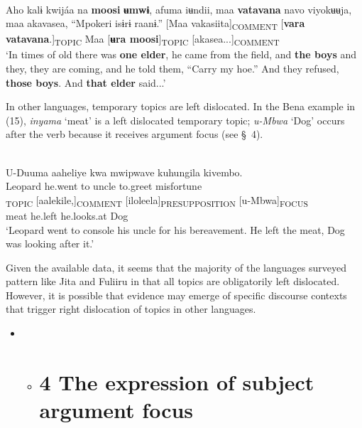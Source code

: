 \documentclass[output=paper]{langsci/langscibook}
\begin{document}
\ea\label{ex:}
\\
Aho kalɨ kwijáa na \textbf{moosi }\textbf{ʉ}\textbf{mw}\textbf{ɨ}, afuma iʉndii, maa \textbf{vatavana} navo viyokʉʉja, maa akavasea, “Mpokeri isɨrɨ raanɨ.” [Maa vakasiita]\textsubscript{COMME}\textsubscript{NT} [\textbf{vara vatavana}.]\textsubscript{TOPIC} Maa [\textbf{ʉ}\textbf{ra moosi}]\textsubscript{TOPIC} [akasea...]\textsubscript{COMMENT}\\
\glt \textup{‘}\textup{In times of old there was }\textbf{\textup{one elder}}\textup{, he came from the field, and }\textbf{\textup{the boys}}\textup{ and they, they are coming, and he told them, “Carry my hoe.” And }\textup{they refused, }\textbf{\textup{those boys}}\textup{. And }\textbf{\textup{that elder}}\textup{ said...’}
\z

In other languages, temporary topics are left dislocated. In the Bena example in (15), \emph{inyama} ‘meat’ is a left dislocated temporary topic; \textit{u}\textit{\nobreakdash-Mbwa} ‘Dog’ occurs after the verb because it receives argument focus (see §~4).

\ea\label{ex:}
\\
\gll U-Duuma aaheliye kwa mwipwave kuhungila kivembo.\\
Leopard he.went to uncle to.greet misfortune\\


\gll [Inyama]\textsubscript{TOPIC} [aalekile,]\textsubscript{COMMENT} [iloleela]\textsubscript{PRESUPPOSITION} [u-Mbwa]\textsubscript{FOCUS}\\
meat he.left he.looks.at Dog\\


\glt \textup{‘Leopard went to console his uncle for his bereavement. He left}\textup{ the meat, Dog was looking after it}\textup{.’}
\z

Given the available data, it seems that the majority of the languages surveyed pattern like Jita and Fuliiru in that all topics are obligatorily left dislocated. However, it is possible that evidence may emerge of specific discourse contexts that trigger right dislocation of topics in other languages.

\begin{itemize}
\item \begin{itemize}
\item \section{4  The expression of subject argument focus}\end{itemize}
\end{itemize}
\end{document}
